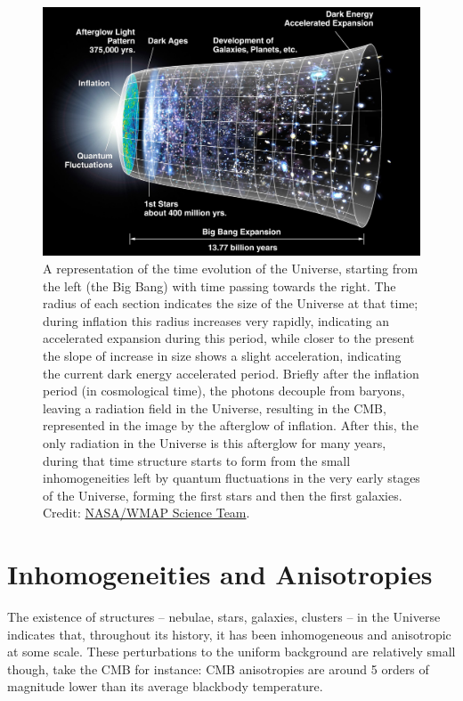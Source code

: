 \documentclass[openany,a4paper,12pt,oneside]{book}
\begin{document}
\begin{spacing}{1.5}
\begin{figure}[!htb]
    \centering
    \includegraphics[width=.9\linewidth]{Imagens/CMB_Timeline300_no_WMAP.jpg}
    \caption{A representation of the time evolution of the Universe, starting from the left (the Big Bang) with time passing towards the right. The radius of each section indicates the size of the Universe at that time; during inflation this radius increases very rapidly, indicating an accelerated expansion during this period, while closer to the present the slope of increase in size shows a slight acceleration, indicating the current dark energy accelerated period. Briefly after the inflation period (in cosmological time), the photons decouple from baryons, leaving a radiation field in the Universe, resulting in the CMB, represented in the image by the afterglow of inflation. After this, the only radiation in the Universe is this afterglow for many years, during that time structure starts to form from the small inhomogeneities left by quantum fluctuations in the very early stages of the Universe, forming the first stars and then the first galaxies. Credit: \href{https://map.gsfc.nasa.gov/media/060915/index.html}{NASA/WMAP Science Team}.}
    \label{fig:cosmo_brief_history}
\end{figure}

\section{Inhomogeneities and Anisotropies}

The existence of structures -- nebulae, stars, galaxies, clusters -- in the Universe indicates that, throughout its history, it has been inhomogeneous and anisotropic at some scale. These perturbations to the uniform background are relatively small though, take the CMB for instance: CMB anisotropies are around 5 orders of magnitude lower than its average blackbody temperature\cite{WMAP_results}. 


\end{spacing}
\end{document}
